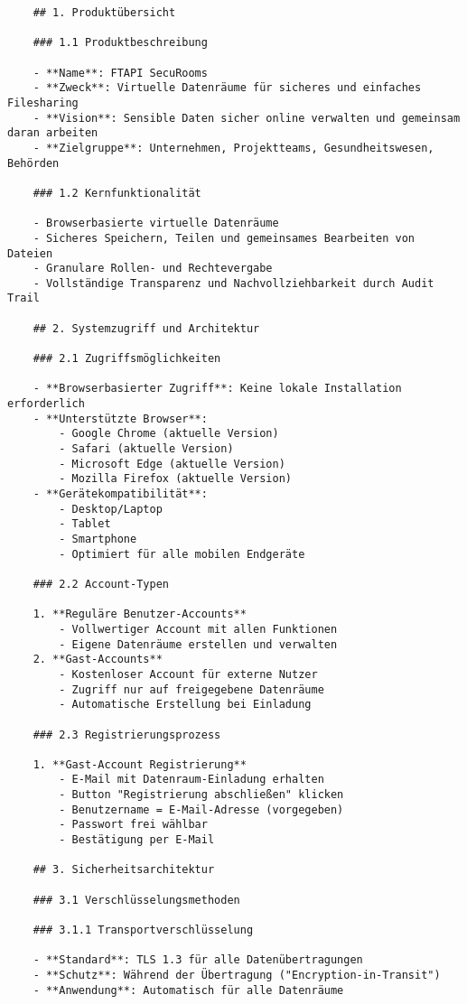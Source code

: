 \begin{verbatim}
    ## 1. Produktübersicht

    ### 1.1 Produktbeschreibung
    
    - **Name**: FTAPI SecuRooms
    - **Zweck**: Virtuelle Datenräume für sicheres und einfaches Filesharing
    - **Vision**: Sensible Daten sicher online verwalten und gemeinsam daran arbeiten
    - **Zielgruppe**: Unternehmen, Projektteams, Gesundheitswesen, Behörden
    
    ### 1.2 Kernfunktionalität
    
    - Browserbasierte virtuelle Datenräume
    - Sicheres Speichern, Teilen und gemeinsames Bearbeiten von Dateien
    - Granulare Rollen- und Rechtevergabe
    - Vollständige Transparenz und Nachvollziehbarkeit durch Audit Trail
    
    ## 2. Systemzugriff und Architektur
    
    ### 2.1 Zugriffsmöglichkeiten
    
    - **Browserbasierter Zugriff**: Keine lokale Installation erforderlich
    - **Unterstützte Browser**:
        - Google Chrome (aktuelle Version)
        - Safari (aktuelle Version)
        - Microsoft Edge (aktuelle Version)
        - Mozilla Firefox (aktuelle Version)
    - **Gerätekompatibilität**:
        - Desktop/Laptop
        - Tablet
        - Smartphone
        - Optimiert für alle mobilen Endgeräte
    
    ### 2.2 Account-Typen
    
    1. **Reguläre Benutzer-Accounts**
        - Vollwertiger Account mit allen Funktionen
        - Eigene Datenräume erstellen und verwalten
    2. **Gast-Accounts**
        - Kostenloser Account für externe Nutzer
        - Zugriff nur auf freigegebene Datenräume
        - Automatische Erstellung bei Einladung
    
    ### 2.3 Registrierungsprozess
    
    1. **Gast-Account Registrierung**
        - E-Mail mit Datenraum-Einladung erhalten
        - Button "Registrierung abschließen" klicken
        - Benutzername = E-Mail-Adresse (vorgegeben)
        - Passwort frei wählbar
        - Bestätigung per E-Mail
    
    ## 3. Sicherheitsarchitektur
    
    ### 3.1 Verschlüsselungsmethoden
    
    ### 3.1.1 Transportverschlüsselung
    
    - **Standard**: TLS 1.3 für alle Datenübertragungen
    - **Schutz**: Während der Übertragung ("Encryption-in-Transit")
    - **Anwendung**: Automatisch für alle Datenräume
    

\end{verbatim}
